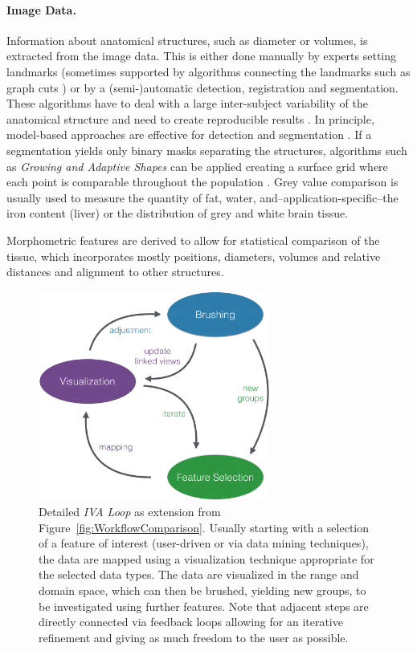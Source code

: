 \documentclass[journal]{style/vgtc} 			          %
\begin{document}
\paragraph{Image Data. }
Information about anatomical structures, such as diameter or volumes, is extracted from the image data.
%
This is either done manually by experts setting landmarks (sometimes supported by algorithms connecting the landmarks such as graph cuts \cite{GraphCut}) or by a (semi-)automatic detection, registration and segmentation.
%
These algorithms have to deal with a large inter-subject variability of the anatomical structure and need to create reproducible results \cite{Preim2014}.
%
In principle, model-based approaches are effective for detection \cite{Rak2013} and segmentation \cite{Gloger2010, Gloger2012}.
%
If a segmentation yields only binary masks separating the structures, algorithms such as \emph{Growing and Adaptive Shapes} can be applied creating a surface grid where each point is comparable throughout the population \cite{Ferrarini2007}.
%
Grey value comparison is usually used to measure the quantity of fat, water, and--application-specific--the iron content (liver) or the distribution of grey and white brain tissue.

Morphometric features are derived to allow for statistical comparison of the tissue, which incorporates mostly positions, diameters, volumes and relative distances and alignment to other structures.
\begin{figure}[htb]
 \centering
 \includegraphics[width=3.0in]{figures/InteractionLoop}
 \caption{Detailed \emph{IVA Loop} as extension from Figure~\ref{fig:WorkflowComparison}.
 Usually starting with a selection of a feature of interest (user-driven or via data mining techniques), the data are mapped using a visualization technique appropriate for the selected data types.
 The data are visualized in the range and domain space, which can then be brushed, yielding new groups, to be investigated using further features.
 Note that adjacent steps are directly connected via feedback loops allowing for an iterative refinement and giving as much freedom to the user as possible.}
 \label{fig:InteractionLoop}
\end{figure}
\end{document}

